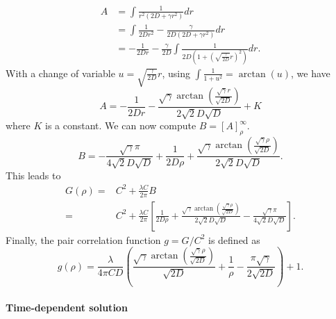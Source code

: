 \documentclass[12pt,english]{article}
\begin{document}
\begin{align}
A & =\int\frac{1}{r^{2}\left(2D+\gamma r^{2}\right)}dr\\
 & =\int\frac{1}{2Dr^{2}}-\frac{\gamma}{2D\left(2D+\gamma r^{2}\right)}dr\\
 & =-\frac{1}{2Dr}-\frac{\gamma}{2D}\int\frac{1}{2D\left(1+\left(\sqrt{\frac{\gamma}{2D}}r\right)^{2}\right)}dr.
\end{align}
With a change of variable $u=\sqrt{\frac{\gamma}{2D}}r$, using $\int\frac{1}{1+u^{2}}=\arctan(u)$,
we have 
\begin{equation}
A=-\frac{1}{2Dr}-\frac{\sqrt{\gamma}\arctan\left(\frac{\sqrt{\gamma}r}{\sqrt{2D}}\right)}{2\sqrt{2}D\sqrt{D}}+K
\end{equation}
where $K$ is a constant. We can now compute $B=[A]_{\rho}^{\infty}.$
\begin{equation}
B=-\frac{\sqrt{\gamma}\pi}{4\sqrt{2}D\sqrt{D}}+\frac{1}{2D\rho}+\frac{\sqrt{\gamma}\arctan\left(\frac{\sqrt{\gamma}\rho}{\sqrt{2D}}\right)}{2\sqrt{2}D\sqrt{D}}.
\end{equation}
This leads to 
\begin{align}
G(\rho)= & C^{2}+\frac{\lambda C}{2\pi}B\\
= & C^{2}+\frac{\lambda C}{2\pi}\left[\frac{1}{2D\rho}+\frac{\sqrt{\gamma}\arctan\left(\frac{\sqrt{\gamma}\rho}{\sqrt{2D}}\right)}{2\sqrt{2}D\sqrt{D}}-\frac{\sqrt{\gamma}\pi}{4\sqrt{2}D\sqrt{D}}\right].
\end{align}
Finally, the pair correlation function $g=G/C^{2}$ is defined as
\begin{equation}
g(\rho)=\frac{\lambda}{4\pi CD}\left(\frac{\sqrt{\gamma}\arctan\left(\frac{\sqrt{\gamma}\rho}{\sqrt{2D}}\right)}{\sqrt{2D}}+\frac{1}{\rho}-\frac{\pi\sqrt{\gamma}}{2\sqrt{2D}}\right)+1.\label{eq:pcf_adv_bbm}
\end{equation}


\paragraph{Time-dependent solution}
\end{document}
